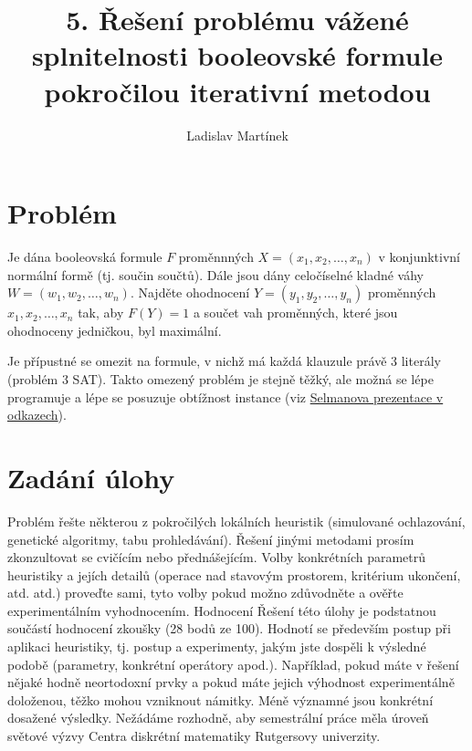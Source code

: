 \documentclass[11pt]{article}
\begin{document}

\title{5. Řešení problému vážené splnitelnosti booleovské formule pokročilou iterativní metodou}
\author{Ladislav Martínek}
\date{}
\maketitle
 
\section{Problém} \label{kap:problem}
 Je dána booleovská formule $F$ proměnnných $X=(x_1, x_2, \dots, x_n)$ v konjunktivní normální formě (tj. součin součtů). Dále jsou dány celočíselné kladné váhy $W=(w_1, w_2, \dots, w_n).$ Najděte ohodnocení $Y=(y_1, y_2, \dots, y_n)$ proměnných $x_1, x_2, \dots, x_n$ tak, aby $F(Y)=1$ a součet vah proměnných, které jsou ohodnoceny jedničkou, byl maximální.

Je přípustné se omezit na formule, v nichž má každá klauzule právě 3 literály (problém 3 SAT). Takto omezený problém je stejně těžký, ale možná se lépe programuje a lépe se posuzuje obtížnost instance (viz \href{https://moodle.fit.cvut.cz/course/format/wiki/mediafile.php?id=99&path=%2fhomeworks%2f06%2fai-phys1.pdf}{Selmanova prezentace v odkazech}).
 
 
\section{Zadání úlohy} \label{kap:zadani}

Problém řešte některou z pokročilých lokálních heuristik (simulované ochlazování, genetické algoritmy, tabu prohledávání). Řešení jinými metodami prosím zkonzultovat se cvičícím nebo předná\-šejícím. Volby konkrétních parametrů heuristiky a jejích detailů (operace nad stavovým prostorem, kritérium ukončení, atd. atd.) proveďte sami, tyto volby pokud možno zdůvodněte a ověřte experimentálním vyhodnocením. Hodnocení Řešení této úlohy je podstatnou součástí hodnocení zkoušky (28 bodů ze 100). Hodnotí se především postup při aplikaci heuristiky, tj. postup a experimenty, jakým jste dospěli k výsledné podobě (parametry, konkrétní operátory apod.). Například, pokud máte v řešení nějaké hodně neortodoxní prvky a pokud máte jejich výhodnost experimentálně doloženou, těžko mohou vzniknout námitky. Méně významné jsou konkrétní dosažené výsledky. Nežádáme rozhodně, aby semestrální práce měla úroveň světové výzvy Centra diskrétní matematiky Rutgersovy univerzity.
\end{document}
